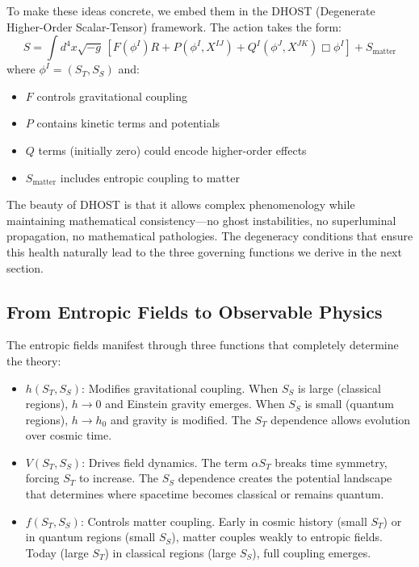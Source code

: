\documentclass[12pt]{article}
\begin{document}
To make these ideas concrete, we embed them in the DHOST (Degenerate Higher-Order Scalar-Tensor) framework. The action takes the form:
\begin{equation}
S = \int d^4x \sqrt{-g}\,\left[ F(\phi^I) R + P(\phi^I, X^{IJ}) + Q^I(\phi^J, X^{JK}) \Box \phi^I \right] + S_\mathrm{matter}
\end{equation}
where $\phi^I = (S_T, S_S)$ and:
\begin{itemize}
    \item $F$ controls gravitational coupling
    \item $P$ contains kinetic terms and potentials
    \item $Q$ terms (initially zero) could encode higher-order effects
    \item $S_\mathrm{matter}$ includes entropic coupling to matter
\end{itemize}
The beauty of DHOST is that it allows complex phenomenology while maintaining mathematical consistency---no ghost instabilities, no superluminal propagation, no mathematical pathologies. The degeneracy conditions that ensure this health naturally lead to the three governing functions we derive in the next section.

\subsection{From Entropic Fields to Observable Physics}

The entropic fields manifest through three functions that completely determine the theory:
\begin{itemize}
    \item \textbf{$h(S_T, S_S)$}: Modifies gravitational coupling. When $S_S$ is large (classical regions), $h \rightarrow 0$ and Einstein gravity emerges. When $S_S$ is small (quantum regions), $h \rightarrow h_0$ and gravity is modified. The $S_T$ dependence allows evolution over cosmic time.
    \item \textbf{$V(S_T, S_S)$}: Drives field dynamics. The term $\alpha S_T$ breaks time symmetry, forcing $S_T$ to increase. The $S_S$ dependence creates the potential landscape that determines where spacetime becomes classical or remains quantum.
    \item \textbf{$f(S_T, S_S)$}: Controls matter coupling. Early in cosmic history (small $S_T$) or in quantum regions (small $S_S$), matter couples weakly to entropic fields. Today (large $S_T$) in classical regions (large $S_S$), full coupling emerges.
\end{itemize}
\end{document}
